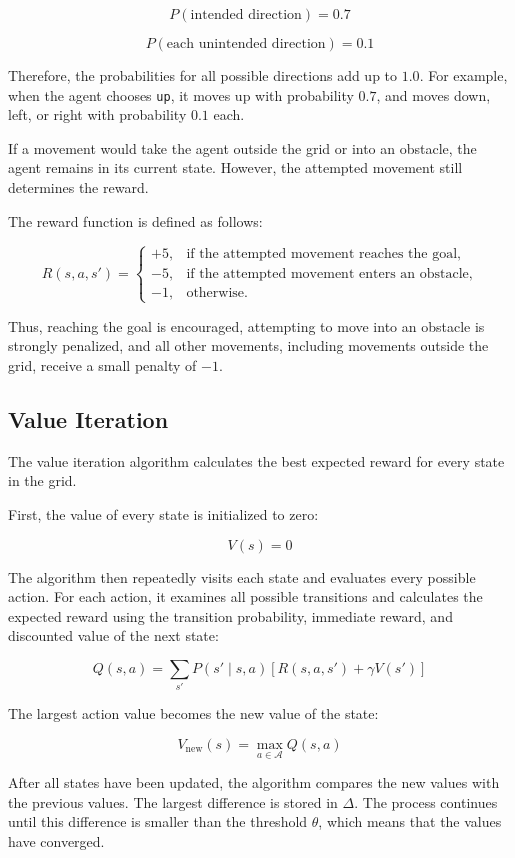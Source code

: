 \documentclass{scrartcl}
\theoremstyle{mytheoremstyle}
\theoremstyle{mytheoremstyle}
\theoremstyle{myproblemstyle}
\begin{document}
\[
    P(\text{intended direction}) = 0.7
\]

\[
    P(\text{each unintended direction}) = 0.1
\]

Therefore, the probabilities for all possible directions add up to \(1.0\).
For example, when the agent chooses \texttt{up}, it moves up with probability
\(0.7\), and moves down, left, or right with probability \(0.1\) each.

If a movement would take the agent outside the grid or into an obstacle, the
agent remains in its current state. However, the attempted movement still
determines the reward.

The reward function is defined as follows:

\[
    R(s,a,s') =
    \begin{cases}
        +5, & \text{if the attempted movement reaches the goal},   \\
        -5, & \text{if the attempted movement enters an obstacle}, \\
        -1, & \text{otherwise}.
    \end{cases}
\]

Thus, reaching the goal is encouraged, attempting to move into an obstacle is
strongly penalized, and all other movements, including movements outside the
grid, receive a small penalty of \(-1\).

\subsection{Value Iteration}

The value iteration algorithm calculates the best expected reward for every
state in the grid.

First, the value of every state is initialized to zero:

\[
    V(s) = 0
\]

The algorithm then repeatedly visits each state and evaluates every possible
action. For each action, it examines all possible transitions and calculates
the expected reward using the transition probability, immediate reward, and
discounted value of the next state:

\[
    Q(s,a) =
    \sum_{s'}
    P(s' \mid s,a)
    \left[
        R(s,a,s') + \gamma V(s')
        \right]
\]

The largest action value becomes the new value of the state:

\[
    V_{\text{new}}(s) = \max_{a \in \mathcal{A}} Q(s,a)
\]

After all states have been updated, the algorithm compares the new values with
the previous values. The largest difference is stored in \(\Delta\). The process
continues until this difference is smaller than the threshold \(\theta\), which
means that the values have converged.
\end{document}
